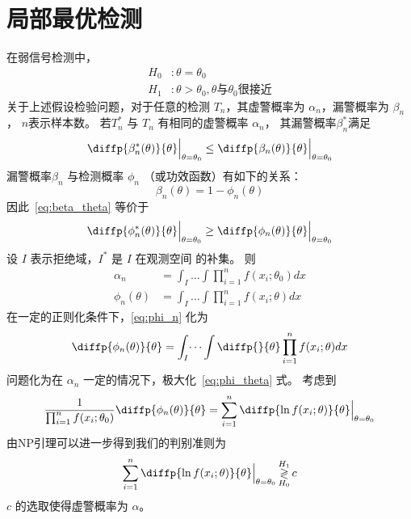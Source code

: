 \documentclass{ctexart}
\numberwithin{equation}{section}
\begin{document}
\section{局部最优检测}
在弱信号检测中，
\begin{align}
H_0 & : \theta = \theta_0 \\
H_1 & : \theta > \theta_0,  \theta\textrm{与$\theta_0$很接近}
\end{align}
关于上述假设检验问题，对于任意的检测 $T_n$，其虚警概率为 $\alpha_n$，漏警概率为 $\beta_n$，
$n$表示样本数。 若$T_n^*$ 与 $T_n$ 有相同的虚警概率 $\alpha_n$， 其漏警概率$\beta^*_n$满足
\begin{equation}\label{eq:beta_theta}
\diffp{\beta_n^*(\theta)}{\theta}\Big\vert_{\theta = \theta_0} \leq \diffp{\beta_n(\theta)}{\theta}\Big\vert_{\theta = \theta_0}
\end{equation}
漏警概率$\beta_n$ 与检测概率 $ \phi_n$ （或功效函数）有如下的关系：
\begin{equation}
 \beta_n(\theta ) = 1 - \phi_n(\theta)
\end{equation}
因此~\eqref{eq:beta_theta} 等价于 
$$
\diffp{\phi_n^*(\theta)}{\theta}\Big\vert_{\theta = \theta_0} \geq \diffp{\phi_n(\theta)}{\theta}\Big\vert_{\theta = \theta_0}
$$
设 $I$ 表示拒绝域，$I^*$ 是 $I$ 在观测空间 的补集。
则
\begin{align}
\alpha_n & = \int_I \dots \int \prod_{i=1}^n f(x_i; \theta_0) dx \\
\label{eq:phi_n}\phi_n(\theta) & = \int_I \dots \int \prod_{i=1}^n f(x_i; \theta) dx
\end{align}
在一定的正则化条件下，\eqref{eq:phi_n} 化为
\begin{equation}\label{eq:phi_theta}
\diffp{\phi_n(\theta)}{\theta} = \int_I \dots \int \diffp{}{\theta} \prod_{i=1}^n f(x_i; \theta) dx
\end{equation}
问题化为在 $\alpha_n$ 一定的情况下，极大化~\eqref{eq:phi_theta} 式。
考虑到
$$
{1 \over \prod_{i=1}^n f(x_i; \theta_0)}\diffp{\phi_n(\theta)}{\theta} = \sum_{i=1}^n \diffp{\ln f(x_i; \theta)}{\theta}\Big\vert_{\theta = \theta_0}
$$
由NP引理可以进一步得到我们的判别准则为
\begin{equation}
\sum_{i=1}^n \diffp{\ln f(x_i; \theta)}{\theta}\Big\vert_{\theta = \theta_0} \mathop{\gtrless}_{H_0}^{H_1}
c
\end{equation}
$c$ 的选取使得虚警概率为 $\alpha$。
\end{document}
